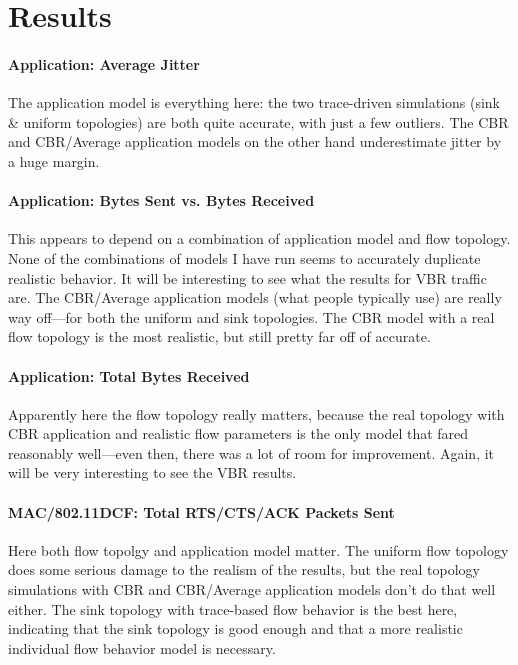 \documentclass{article}
\begin{document}
\section{Results}

\begin{sidewaystable}
\small
\end{sidewaystable}

\paragraph{Application: Average Jitter}

The application model is everything here: the two trace-driven simulations (sink \& uniform topologies) are both quite accurate, with just a few outliers. The CBR and CBR/Average application models on the other hand underestimate jitter by a huge margin.

\paragraph{Application: Bytes Sent vs. Bytes Received}

This appears to depend on a combination of application model and flow topology. None of the combinations of models I have run seems to accurately duplicate realistic behavior. It will be interesting to see what the results for VBR traffic are. The CBR/Average application models (what people typically use) are really way off—for both the uniform and sink topologies. The CBR model with a real flow topology is the most realistic, but still pretty far off of accurate.

\paragraph{Application: Total Bytes Received}

Apparently here the flow topology really matters, because the real topology with CBR application and realistic flow parameters is the only model that fared reasonably well—even then, there was a lot of room for improvement. Again, it will be very interesting to see the VBR results.

\paragraph{MAC/802.11DCF: Total RTS/CTS/ACK Packets Sent}

Here both flow topolgy and application model matter. The uniform flow topology does some serious damage to the realism of the results, but the real topology simulations with CBR and CBR/Average application models don't do that well either. The sink topology with trace-based flow behavior is the best here, indicating that the sink topology is good enough and that a more realistic individual flow behavior model is necessary.
\end{document}
